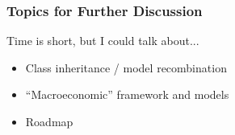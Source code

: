 \documentclass[11ptt]{beamer}
\begin{document}
\begin{frame}\label{DiscussionTopics}
  \frametitle{Topics for Further Discussion}

  Time is short, but I could talk about...
  \begin{itemize}
  \item Class inheritance / model recombination \hyperlink{Recombination}{}

  \item ``Macroeconomic'' framework and models \hyperlink{Macroeconomics}{}

  \item Roadmap \hyperlink{HARKFuture}{}
  \end{itemize}
\end{frame}
\end{document}
